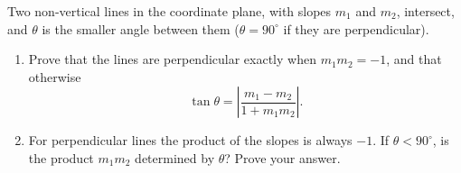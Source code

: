 Two non-vertical lines in the coordinate plane, with slopes $m_1$ and $m_2$, intersect, and $\theta$ is the smaller angle between them ($\theta=90^\circ$ if they are perpendicular).
\begin{enumerate}
\item[(a)] Prove that the lines are perpendicular exactly when $m_1m_2=-1$, and that otherwise
\[\tan\theta=\left|\dfrac{m_1-m_2}{1+m_1m_2}\right| .\]
\item[(b)] For perpendicular lines the product of the slopes is always $-1$. If $\theta<90^\circ$, is the product $m_1m_2$ determined by $\theta$? Prove your answer.
\end{enumerate}
